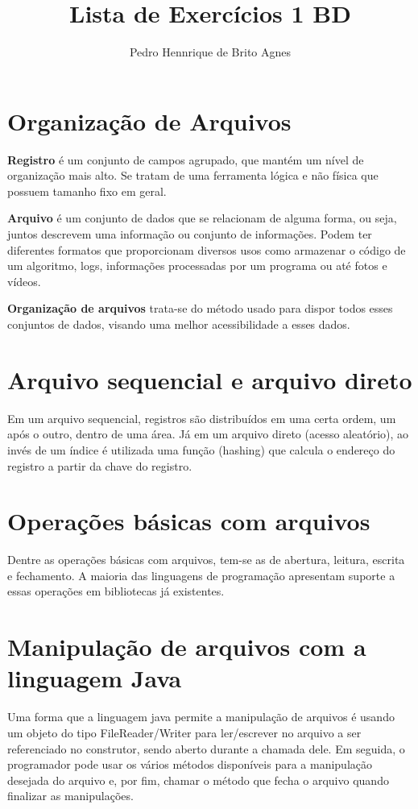 \documentclass[12pt]{article}
\begin{document}
\title{Lista de Exercícios 1 BD}
\author{Pedro Hennrique de Brito Agnes}

\maketitle

\section{Organização de Arquivos}
\textbf{Registro} é um conjunto de campos agrupado, que mantém um nível de organização mais alto. Se tratam de uma ferramenta lógica e não física que possuem tamanho fixo em geral. 

\noindent
\textbf{Arquivo} é um conjunto de dados que se relacionam de alguma forma, ou seja, juntos descrevem uma informação ou conjunto de informações. Podem ter diferentes formatos que proporcionam diversos usos como armazenar o código de um algoritmo, logs, informações processadas por um programa ou até fotos e vídeos.

\noindent
\textbf{Organização de arquivos} trata-se do método usado para dispor todos esses conjuntos de dados, visando uma melhor acessibilidade a esses dados.

\section{Arquivo sequencial e arquivo direto}
Em um arquivo sequencial, registros são distribuídos em uma certa ordem, um após o outro, dentro de uma área.
Já em um arquivo direto (acesso aleatório), ao invés de um índice é utilizada uma função (hashing) que calcula o endereço do registro a partir da chave do registro.

\section{Operações básicas com arquivos}
Dentre as operações básicas com arquivos, tem-se as de abertura, leitura, escrita e fechamento. A maioria das linguagens de programação apresentam suporte a essas operações em bibliotecas já existentes.

\section{Manipulação de arquivos com a linguagem Java}
Uma forma que a linguagem java permite a manipulação de arquivos é usando um objeto do tipo FileReader/Writer para ler/escrever no arquivo a ser referenciado no construtor, sendo aberto durante a chamada dele.
Em seguida, o programador pode usar os vários métodos disponíveis para a manipulação desejada do arquivo e, por fim, chamar o método que fecha o arquivo quando finalizar as manipulações.
\end{document}
